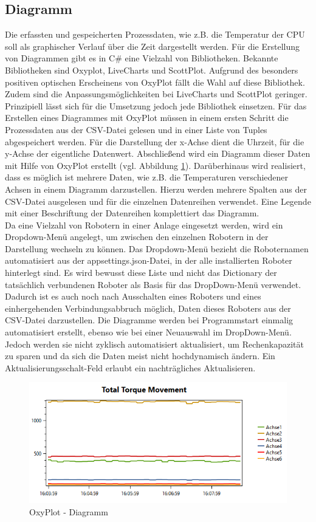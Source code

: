 \documentclass[ a4paper,
                oneside,
                toc=bibliography,
                toc=listof
                ]{scrbook}
\begin{document}
   	\subsection{Diagramm}
   	Die erfassten und gespeicherten Prozessdaten, wie z.B. die Temperatur der CPU soll als graphischer Verlauf über die Zeit dargestellt werden. Für die Erstellung von Diagrammen gibt es in C\# eine Vielzahl von Bibliotheken. Bekannte Bibliotheken sind Oxyplot, LiveCharts und ScottPlot. Aufgrund des besonders positiven optischen Erscheinens von OxyPlot fällt die Wahl auf diese Bibliothek. Zudem sind die Anpassungsmöglichkeiten bei LiveCharts und ScottPlot geringer. Prinzipiell lässt sich für die Umsetzung jedoch jede Bibliothek einsetzen. Für das Erstellen eines Diagrammes mit OxyPlot müssen in einem ersten Schritt die Prozessdaten aus der CSV-Datei gelesen und in einer Liste von Tuples abgespeichert werden. Für die Darstellung der x-Achse dient die Uhrzeit, für die y-Achse der eigentliche Datenwert. Abschließend wird ein Diagramm dieser Daten mit Hilfe von OxyPlot erstellt (vgl. Abbildung \ref{fig:oxyplot}). Darüberhinaus wird realisiert, dass es möglich ist mehrere Daten, wie z.B. die Temperaturen verschiedener Achsen in einem Diagramm darzustellen. Hierzu werden mehrere Spalten aus der CSV-Datei ausgelesen und für die einzelnen Datenreihen verwendet. Eine Legende mit einer Beschriftung der Datenreihen komplettiert das Diagramm. \\
   	Da eine Vielzahl von Robotern in einer Anlage eingesetzt werden, wird ein Dropdown-Menü angelegt, um zwischen den einzelnen Robotern in der Darstellung wechseln zu können. Das Dropdown-Menü bezieht die Roboternamen automatisiert aus der appsettings.json-Datei, in der alle installierten Roboter hinterlegt sind. Es wird bewusst diese Liste und nicht das Dictionary der tatsächlich verbundenen Roboter als Basis für das DropDown-Menü verwendet. Dadurch ist es auch noch nach Ausschalten eines Roboters und eines einhergehenden Verbindungsabbruch möglich, Daten dieses Roboters aus der CSV-Datei darzustellen. Die Diagramme werden bei Programmstart einmalig automatisiert erstellt, ebenso wie bei einer Neuauswahl im DropDown-Menü. Jedoch werden sie nicht zyklisch automatisiert aktualisiert, um Rechenkapazität zu sparen und da sich die Daten meist nicht hochdynamisch ändern. Ein Aktualisierungsschalt-Feld erlaubt ein nachträgliches Aktualisieren.
   	\begin{figure}[!ht]
   		\centering
   		\includegraphics[width=1.0\linewidth]{./images/Diagrammoxyplot.png}
   		\caption{OxyPlot - Diagramm}
   		\label{fig:oxyplot}
   	\end{figure}
   	
\end{document}
